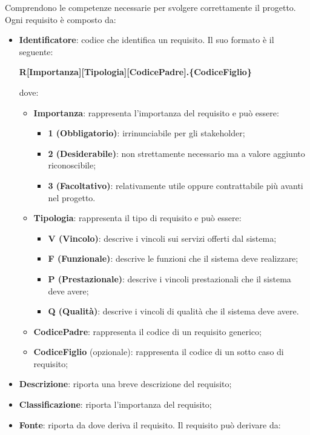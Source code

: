 Comprendono le competenze necessarie per svolgere correttamente il progetto.\\
Ogni requisito è composto da:
\begin{itemize}
\item \textbf{Identificatore}: codice che identifica un requisito. Il suo formato è il seguente:
\begin{center}
\textbf{R[Importanza][Tipologia][CodicePadre].\{CodiceFiglio\}}\\
\end{center}
dove:
\begin{itemize}
\item \textbf{Importanza}: rappresenta l'importanza del requisito e può essere:
\begin{itemize}
\item \textbf{1 (Obbligatorio)}: irrinunciabile per gli stakeholder;
\item \textbf{2 (Desiderabile)}: non strettamente necessario ma a valore aggiunto riconoscibile;
\item \textbf{3 (Facoltativo)}: relativamente utile oppure contrattabile più avanti nel progetto.
\end{itemize}
\item \textbf{Tipologia}: rappresenta il tipo di requisito e può essere:
\begin{itemize}
\item \textbf{V (Vincolo)}: descrive i vincoli sui servizi offerti dal sistema;
\item \textbf{F (Funzionale)}: descrive le funzioni che il sistema deve realizzare;
\item \textbf{P (Prestazionale)}: descrive i vincoli prestazionali che il sistema deve avere;
\item \textbf{Q (Qualità)}: descrive i vincoli di qualità che il sistema deve avere.
\end{itemize}
\item \textbf{CodicePadre}: rappresenta il codice di un requisito generico;
\item \textbf{CodiceFiglio} (opzionale): rappresenta il codice di un sotto caso di requisito;
\end{itemize}
\item \textbf{Descrizione}: riporta una breve descrizione del requisito;
\item \textbf{Classificazione}: riporta l'importanza del requisito;
\item \textbf{Fonte}: riporta da dove deriva il requisito. Il requisito può derivare da:

\end{itemize}
